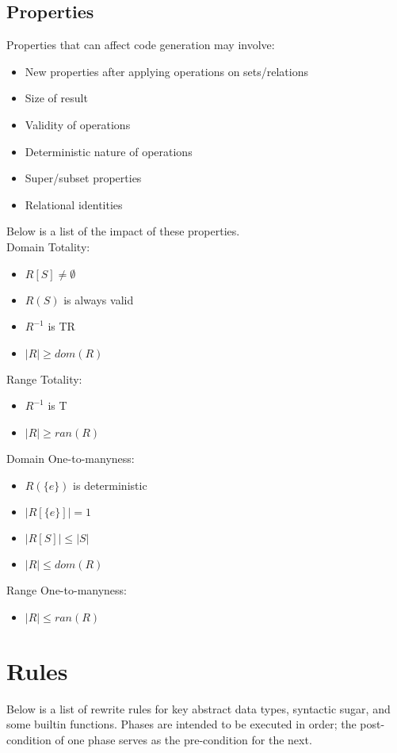 \documentclass{article}
\begin{document}
\subsection{Properties}
Properties that can affect code generation may involve:
\begin{itemize}
  \item New properties after applying operations on sets/relations
  \item Size of result
  \item Validity of operations
  \item Deterministic nature of operations
  \item Super/subset properties
  \item Relational identities
\end{itemize}
%
Below is a list of the impact of these properties.
\\
Domain Totality:
\begin{itemize}
  \item $R[S] \neq \emptyset$
  \item $R(S)$ is always valid
  \item $R^{-1}$ is TR
  \item $|R| \geq dom(R)$
\end{itemize}
%
Range Totality:
\begin{itemize}
  \item $R^{-1}$ is T
  \item $|R| \geq ran(R)$
\end{itemize}
%
Domain One-to-manyness:
\begin{itemize}
  \item $R(\{e\})$ is deterministic
  \item $|R[\{e\}]| = 1$
  \item $|R[S]| \leq |S|$
  \item $|R| \leq dom(R)$
\end{itemize}
%
Range One-to-manyness:
\begin{itemize}
  \item $|R| \leq ran(R)$
\end{itemize}


\section{Rules}
Below is a list of rewrite rules for key abstract data types, syntactic sugar, and some builtin functions. Phases are intended to be executed in order; the post-condition of one phase serves as the pre-condition for the next.
\end{document}

